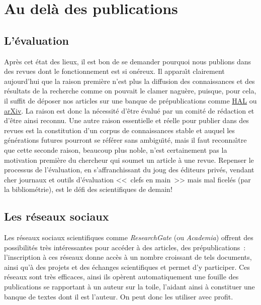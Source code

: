 \section{Au del{\`a} des publications}


\subsection{L'{\'e}valuation}

Apr{\`e}s cet {\'e}tat des lieux, il est bon de se demander pourquoi nous publions dans des revues dont le fonctionnement est si on{\'e}reux. Il appara{\^\i}t
clairement aujourd'hui que la raison premi{\`e}re n'est plus la diffusion des connaissances et des r{\'e}sultats de la recherche comme on pouvait le
clamer nagu{\`e}re, puisque, pour cela, il suffit de d{\'e}poser nos articles sur une banque de pr{\'e}publications comme \href{https://hal.archives-ouvertes.fr/}{HAL}
ou \href{https://arxiv.org/}{arXiv}. La raison est donc
la n{\'e}cessit{\'e} d'{\^e}tre {\'e}valu{\'e} par un comit{\'e} de r{\'e}daction et d'{\^e}tre ainsi reconnu. Une autre raison essentielle et r{\'e}elle pour publier dans des revues
est la constitution d'un corpus de connaissances stable et auquel les g{\'e}n{\'e}rations futures pourront se r{\'e}f{\'e}rer sans ambigu{\"\i}t{\'e}, mais il faut reconna{\^\i}tre
que cette seconde raison, beaucoup plus noble, n'est certainement pas la motivation premi{\`e}re du chercheur qui soumet un article {\`a} une revue.
Repenser le processus de l'{\'e}valuation, en s'affranchissant du joug des {\'e}diteurs priv{\'e}s, vendant cher journaux et outils d'{\'e}valuation <<~clefs en main~>>
mais mal ficel{\'e}s (par la bibliom{\'e}trie), est le d{\'e}fi des scientifiques de demain!

\subsection{Les r{\'e}seaux sociaux}

Les r{\'e}seaux sociaux scientifiques comme \emph{ResearchGate} (ou \emph{Academia}) offrent des possibilit{\'e}s tr{\`e}s int{\'e}ressantes pour acc{\'e}der
{\`a} des articles, des pr{\'e}publications~: l'inscription {\`a} ces r{\'e}seaux donne acc{\`e}s {\`a} un nombre croissant de tels documents,
ainsi qu'{\`a} des projets et des {\'e}changes scientifiques et permet d'y participer. Ces r{\'e}seaux sont tr{\`e}s efficaces, ainsi ils
op{\`e}rent automatiquement une fouille des publications se rapportant {\`a} un auteur sur la toile, l'aidant ainsi {\`a} constituer une banque
de textes dont il est l'auteur. On peut donc les utiliser avec profit.


